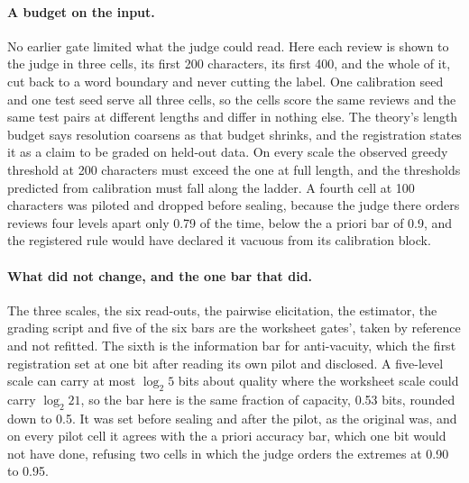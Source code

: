 \paragraph{A budget on the input.}
No earlier gate limited what the judge could read. Here each review is shown to the judge in three cells, its first 200 characters, its first 400, and the whole of it, cut back to a word boundary and never cutting the label. One calibration seed and one test seed serve all three cells, so the cells score the same reviews and the same test pairs at different lengths and differ in nothing else. The theory's length budget says resolution coarsens as that budget shrinks, and the registration states it as a claim to be graded on held-out data. On every scale the observed greedy threshold at 200 characters must exceed the one at full length, and the thresholds predicted from calibration must fall along the ladder. A fourth cell at 100 characters was piloted and dropped before sealing, because the judge there orders reviews four levels apart only 0.79 of the time, below the a priori bar of 0.9, and the registered rule would have declared it vacuous from its calibration block.

\paragraph{What did not change, and the one bar that did.}
The three scales, the six read-outs, the pairwise elicitation, the estimator, the grading script and five of the six bars are the worksheet gates', taken by reference and not refitted. The sixth is the information bar for anti-vacuity, which the first registration set at one bit after reading its own pilot and disclosed. A five-level scale can carry at most $\log_2 5$ bits about quality where the worksheet scale could carry $\log_2 21$, so the bar here is the same fraction of capacity, 0.53 bits, rounded down to 0.5. It was set before sealing and after the pilot, as the original was, and on every pilot cell it agrees with the a priori accuracy bar, which one bit would not have done, refusing two cells in which the judge orders the extremes at 0.90 to 0.95.

